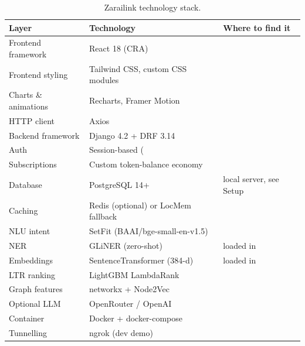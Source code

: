 \documentclass[11pt,a4paper,oneside]{book}
\DeclareRobustCommand{\fileref}[1]{\texorpdfstring{\colorbox{filerefbg}{\strut\ttfamily\small\detokenize{#1}}}{#1}}
\DeclareRobustCommand{\inlinecode}[1]{\texorpdfstring{\colorbox{codebg}{\strut\ttfamily\small\detokenize{#1}}}{#1}}
\begin{document}
\begin{table}[h]
\centering
\small
\begin{tabular}{p{3.2cm} p{4.5cm} p{6.0cm}}
\toprule
\textbf{Layer} & \textbf{Technology} & \textbf{Where to find it} \\
\midrule
Frontend framework  & React 18 (CRA) & \fileref{frontend/src/} \\
Frontend styling    & Tailwind CSS, custom CSS modules & \fileref{frontend/tailwind.config.js} \\
Charts \& animations & Recharts, Framer Motion & \fileref{frontend/src/components/} \\
HTTP client         & Axios & \fileref{frontend/src/services/api.js} \\
Backend framework   & Django 4.2 + DRF 3.14 & \fileref{backend/zarailink/} \\
Auth                & Session-based (\inlinecode{accounts.User}) & \fileref{backend/accounts/} \\
Subscriptions       & Custom token-balance economy & \fileref{backend/subscriptions/} \\
Database            & PostgreSQL 14+ & local server, see Setup \\
Caching             & Redis (optional) or LocMem fallback & \fileref{backend/zarailink/settings.py:115} \\
NLU intent          & SetFit (BAAI/bge-small-en-v1.5) & \fileref{backend/models/zarai_intent_model/} \\
NER                 & GLiNER (zero-shot) & loaded in \fileref{nlu_engine.py} \\
Embeddings          & SentenceTransformer (384-d) & loaded in \fileref{vector_store.py} \\
LTR ranking         & LightGBM LambdaRank & \fileref{backend/search/models/lgbm_ltr.txt} \\
Graph features      & networkx + Node2Vec & \fileref{backend/*.graphml} \\
Optional LLM        & OpenRouter / OpenAI & \fileref{backend/utils/ai_service.py} \\
Container           & Docker + docker-compose & \fileref{docker-compose.yml} \\
Tunnelling          & ngrok (dev demo) & \fileref{backend/ngrok.exe} \\
\bottomrule
\end{tabular}
\caption{Zarailink technology stack.}
\label{tab:stack}
\end{table}
\end{document}
